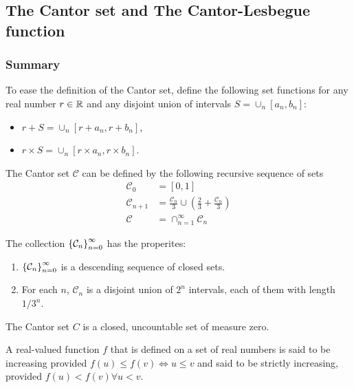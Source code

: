 \newcommand{\cantor}{\mathcal{C}}
\newcommand{\Ocal}{\mathcal{O}}
\newcommand{\union}{\cup}
\newcommand{\intersect}{\cap}


\subsection{The Cantor set and The Cantor-Lesbegue function}
\subsubsection{Summary}

\noindent To ease the definition of the Cantor set, define the following set functions 
for any real number $r\in \mathbb{R}$ and any disjoint union of intervals $S = \union_n [a_n, b_n]$:
\begin{itemize}
    \item $r + S = \union_n \left[r+a_n, r+b_n\right]$,
    \item $r\times S = \union_n \left[r\times a_n, r\times b_n\right]$.
\end{itemize}

\begin{defn}
    The Cantor set $\cantor$ can be defined by the following recursive sequence of sets
    \begin{align}
        \cantor_0 &= [0,1] \\
        \cantor_{n+1} &= \frac{\cantor_n}{3} \union \left(\frac{2}{3} + \frac{\cantor_n}{3}\right) \\
        \cantor &= \intersect_{n=1}^{\infty} \cantor_n
    \end{align}
\end{defn}

\noindent The collection $\seq{\cantor_n}_{n=0}^{\infty}$ has the properites:
\begin{enumerate}[label=(\roman*)]
    \item $\seq{\cantor_n}_{n=0}^{\infty}$ is a descending sequence of closed sets.
    \item For each $n$, $\cantor_{n}$ is a disjoint union of $2^n$ intervals, each of them with length $1/3^n$.
\end{enumerate}

\begin{thm}
    The Cantor set $C$ is a closed, uncountable set of measure zero.
\end{thm}


\noindent A real-valued function $f$ that is defined on a set of real numbers is said to be
increasing provided $f(u) \leq f(v) \iff u \leq v$ and said to be strictly increasing, provided
$f(u) < f(v) \forall u < v$.


